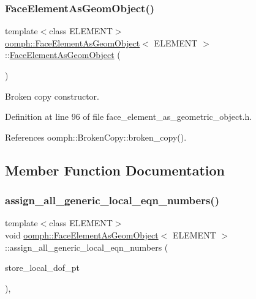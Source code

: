 \subsubsection{\texorpdfstring{Face\+Element\+As\+Geom\+Object()}{FaceElementAsGeomObject()}\hspace{0.1cm}{\footnotesize\ttfamily [2/2]}}
{\footnotesize\ttfamily template$<$class E\+L\+E\+M\+E\+NT$>$ \\
\hyperlink{classoomph_1_1FaceElementAsGeomObject}{oomph\+::\+Face\+Element\+As\+Geom\+Object}$<$ E\+L\+E\+M\+E\+NT $>$\+::\hyperlink{classoomph_1_1FaceElementAsGeomObject}{Face\+Element\+As\+Geom\+Object} (\begin{DoxyParamCaption}\item[{const \hyperlink{classoomph_1_1FaceElementAsGeomObject}{Face\+Element\+As\+Geom\+Object}$<$ E\+L\+E\+M\+E\+NT $>$ \&}]{ }\end{DoxyParamCaption})\hspace{0.3cm}{\ttfamily [inline]}}



Broken copy constructor. 



Definition at line 96 of file face\+\_\+element\+\_\+as\+\_\+geometric\+\_\+object.\+h.



References oomph\+::\+Broken\+Copy\+::broken\+\_\+copy().



\subsection{Member Function Documentation}
\mbox{\label{classoomph_1_1FaceElementAsGeomObject_a744885ae07ad0e4091d43dd349aa699a}} 
\subsubsection{\texorpdfstring{assign\+\_\+all\+\_\+generic\+\_\+local\+\_\+eqn\+\_\+numbers()}{assign\_all\_generic\_local\_eqn\_numbers()}}
{\footnotesize\ttfamily template$<$class E\+L\+E\+M\+E\+NT$>$ \\
void \hyperlink{classoomph_1_1FaceElementAsGeomObject}{oomph\+::\+Face\+Element\+As\+Geom\+Object}$<$ E\+L\+E\+M\+E\+NT $>$\+::assign\+\_\+all\+\_\+generic\+\_\+local\+\_\+eqn\+\_\+numbers (\begin{DoxyParamCaption}\item[{const bool \&}]{store\+\_\+local\+\_\+dof\+\_\+pt }\end{DoxyParamCaption})\hspace{0.3cm}{\ttfamily [inline]}, {\ttfamily [virtual]}}



